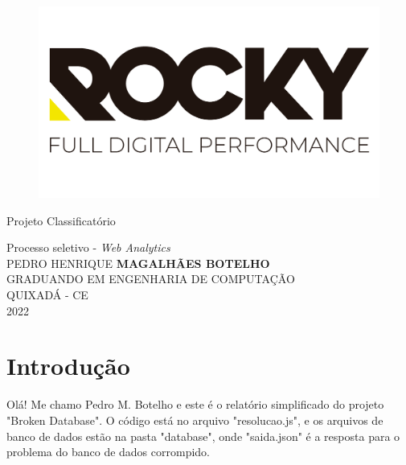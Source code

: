 \documentclass[12pt]{article}
\author{Pedro M. Botelho}
\begin{document}
\begin{titlepage}
\begin{center}
\large


\begin{figure}[!h]
\centering
\includegraphics[width=12cm]{rocky.png}
\end{figure}
\vspace{1.5cm}
\huge{Projeto Classificatório} \par \vspace{1.0cm}
\Large{Processo seletivo - \textit{Web Analytics}}\\ \vspace{3cm}
\large
\textnormal{PEDRO HENRIQUE \textbf{MAGALHÃES BOTELHO}}\\ \vspace{2cm}
GRADUANDO EM ENGENHARIA DE COMPUTAÇÃO\\ \vspace{3cm}
QUIXADÁ - CE\\
2022 \par
\end{center}
\end{titlepage}

\tableofcontents
\newpage
\large

\section{Introdução}

Olá! Me chamo Pedro M. Botelho e este é o relatório simplificado do projeto "Broken Database". O código está no arquivo "resolucao.js", e os arquivos de banco de dados estão na pasta "database", onde "saida.json" é a resposta para o problema do banco de dados corrompido.
\end{document}
